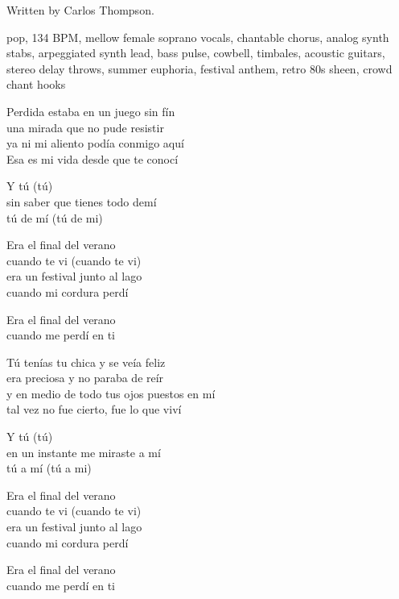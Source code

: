 
\label{sec:verano}
\begin{notes}
Written by Carlos Thompson.
\end{notes}
\begin{style}
pop, 134 BPM, mellow female soprano vocals, chantable chorus, analog synth stabs, arpeggiated synth lead, bass pulse, cowbell, timbales, acoustic guitars, stereo delay throws, summer euphoria, festival anthem, retro 80s sheen, crowd chant hooks
\end{style}
\begin{lyrics}
Perdida estaba en un juego sin fín\\
una mirada que no pude resistir\\
ya ni mi aliento podía conmigo aquí\\
Esa es mi vida desde que te conocí

Y tú (tú)\\
sin saber que tienes todo demí\\
tú de mí (tú de mi)

Era el final del verano\\
cuando te vi (cuando te vi)\\
era un festival junto al lago\\
cuando mi cordura perdí

Era el final del verano\\
cuando me perdí en ti

Tú tenías tu chica y se veía feliz\\
era preciosa y no paraba de reír\\
y en medio de todo tus ojos puestos en mí\\
tal vez no fue cierto, fue lo que viví

Y tú (tú)\\
en un instante me miraste a mí\\
tú a mí (tú a mi)

Era el final del verano\\
cuando te vi (cuando te vi)\\
era un festival junto al lago\\
cuando mi cordura perdí

Era el final del verano\\
cuando me perdí en ti


\end{lyrics}
